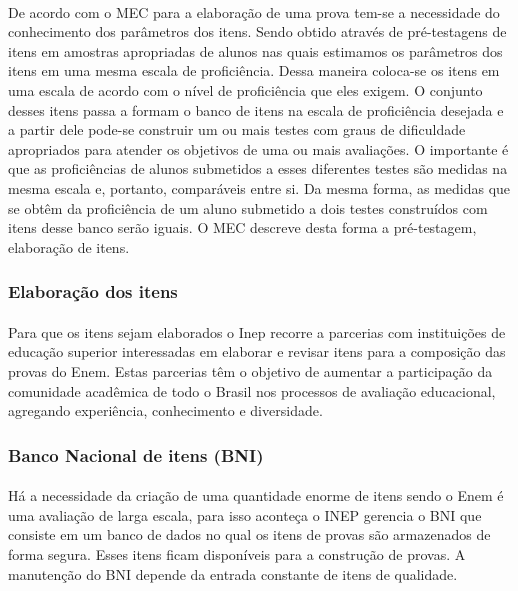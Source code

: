    \paragraph{}
    	De acordo com o MEC para a elaboração  de uma prova  tem-se a necessidade do conhecimento dos parâmetros dos itens. Sendo obtido através de pré-testagens de itens em amostras apropriadas de alunos nas quais estimamos os parâmetros dos itens em uma mesma escala de proficiência. Dessa maneira coloca-se os itens em uma escala de acordo com o nível de proficiência que eles exigem. O conjunto desses itens passa a formam o banco de itens na escala de proficiência desejada e a partir dele pode-se construir um ou mais testes com graus de dificuldade apropriados para atender os objetivos de uma ou mais avaliações. O importante é que as proficiências de alunos submetidos a esses diferentes testes são medidas na mesma escala e, portanto, comparáveis entre si. Da mesma forma, as medidas que se obtêm da proficiência de um aluno submetido a dois testes construídos com itens desse banco serão iguais.
	    O MEC descreve desta forma a pré-testagem, elaboração de itens.
	\subsubsection{Elaboração dos itens}
	\paragraph{}
    	Para que os itens sejam elaborados o Inep recorre a parcerias com instituições de educação superior interessadas em elaborar e revisar itens para a composição das provas do Enem. Estas parcerias têm o objetivo de aumentar a participação da comunidade acadêmica de todo o Brasil nos processos de avaliação educacional, agregando experiência, conhecimento e diversidade.
    \subsubsection{Banco Nacional de itens (BNI)}
    	\paragraph{}
    	Há a necessidade da criação de uma quantidade enorme de itens sendo o Enem é uma avaliação de larga escala, para isso aconteça o INEP gerencia o BNI que consiste em um banco de dados no qual os itens de provas são armazenados de forma segura. Esses itens ficam disponíveis para a construção de provas. A manutenção do BNI depende da entrada constante de itens de qualidade.
